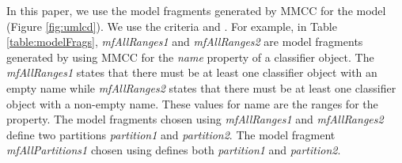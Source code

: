 In this paper, we use the model fragments generated by MMCC for the {\UMLCD}  {\ecore} model (Figure \ref{fig:umlcd}). We use the criteria {\AllRanges} and {\AllPartitions}.   For example, in Table \ref{table:modelFrags}, \emph{mfAllRanges1} and \emph{mfAllRanges2} are model fragments generated by {\Pramana} using MMCC \cite{franck2007} for the \emph{name} property of a classifier object. The \emph{mfAllRanges1} states that there must be at least one classifier object with an empty name while \emph{mfAllRanges2} states that there must be at least one classifier object with a non-empty name. These values for name are the ranges for the property. The model fragments chosen using {\AllRanges} \emph{mfAllRanges1} and \emph{mfAllRanges2} define two partitions \emph{partition1} and \emph{partition2}. The model fragment  \emph{mfAllPartitions1} chosen using {\AllPartitions} defines both \emph{partition1} and \emph{partition2}.

